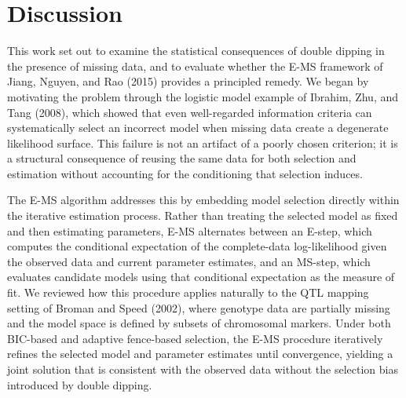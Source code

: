\documentclass[
  12pt,
]{article}
\begin{document}
\section{Discussion}


This work set out to examine the statistical consequences of double dipping 
in the presence of missing data, and to evaluate whether the E-MS framework 
of Jiang, Nguyen, and Rao (2015) provides a principled remedy. We began by 
motivating the problem through the logistic model example of Ibrahim, Zhu, 
and Tang (2008), which showed that even well-regarded information criteria 
can systematically select an incorrect model when missing data create a 
degenerate likelihood surface. This failure is not an artifact of a poorly 
chosen criterion; it is a structural consequence of reusing the same data 
for both selection and estimation without accounting for the conditioning 
that selection induces.

The E-MS algorithm addresses this by embedding model selection directly 
within the iterative estimation process. Rather than treating the selected 
model as fixed and then estimating parameters, E-MS alternates between an 
E-step, which computes the conditional expectation of the complete-data 
log-likelihood given the observed data and current parameter estimates, and 
an MS-step, which evaluates candidate models using that conditional 
expectation as the measure of fit. We reviewed how this procedure applies 
naturally to the QTL mapping setting of Broman and Speed (2002), where 
genotype data are partially missing and the model space is defined by subsets 
of chromosomal markers. Under both BIC-based and adaptive fence-based 
selection, the E-MS procedure iteratively refines the selected model and 
parameter estimates until convergence, yielding a joint solution that is 
consistent with the observed data without the selection bias introduced by 
double dipping.
\end{document}

